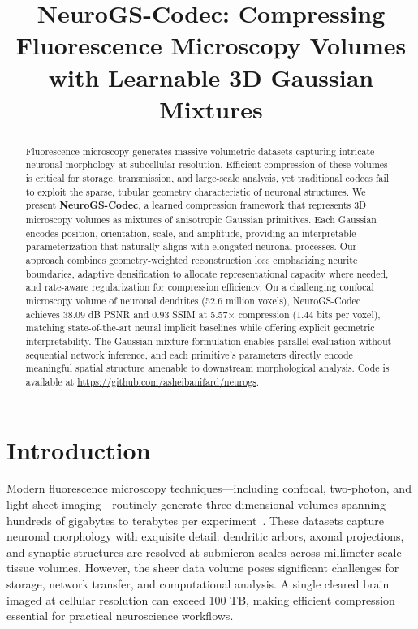 \documentclass[11pt,a4paper]{article}
\title{NeuroGS-Codec: Compressing Fluorescence Microscopy Volumes\\with Learnable 3D Gaussian Mixtures}
\author{}
\date{}
\begin{document}
\maketitle

\begin{abstract}
Fluorescence microscopy generates massive volumetric datasets capturing intricate neuronal morphology at subcellular resolution. Efficient compression of these volumes is critical for storage, transmission, and large-scale analysis, yet traditional codecs fail to exploit the sparse, tubular geometry characteristic of neuronal structures. We present \textbf{NeuroGS-Codec}, a learned compression framework that represents 3D microscopy volumes as mixtures of anisotropic Gaussian primitives. Each Gaussian encodes position, orientation, scale, and amplitude, providing an interpretable parameterization that naturally aligns with elongated neuronal processes. Our approach combines geometry-weighted reconstruction loss emphasizing neurite boundaries, adaptive densification to allocate representational capacity where needed, and rate-aware regularization for compression efficiency. On a challenging confocal microscopy volume of neuronal dendrites (52.6 million voxels), NeuroGS-Codec achieves 38.09 dB PSNR and 0.93 SSIM at 5.57$\times$ compression (1.44 bits per voxel), matching state-of-the-art neural implicit baselines while offering explicit geometric interpretability. The Gaussian mixture formulation enables parallel evaluation without sequential network inference, and each primitive's parameters directly encode meaningful spatial structure amenable to downstream morphological analysis. Code is available at \url{https://github.com/asheibanifard/neurogs}.
\end{abstract}

\section{Introduction}
\label{sec:introduction}

Modern fluorescence microscopy techniques---including confocal, two-photon, and light-sheet imaging---routinely generate three-dimensional volumes spanning hundreds of gigabytes to terabytes per experiment~\cite{preibisch2014efficient}. These datasets capture neuronal morphology with exquisite detail: dendritic arbors, axonal projections, and synaptic structures are resolved at submicron scales across millimeter-scale tissue volumes. However, the sheer data volume poses significant challenges for storage, network transfer, and computational analysis. A single cleared brain imaged at cellular resolution can exceed 100 TB, making efficient compression essential for practical neuroscience workflows.
\end{document}
